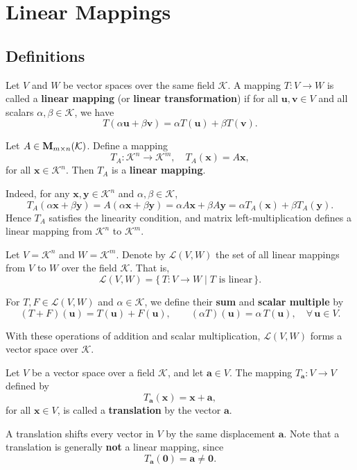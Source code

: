 \chapter{Linear Mappings}

\section{Definitions}
\begin{definitionenv}
	Let $V$ and $W$ be vector spaces over the same field $\mathcal{K}$.
	A mapping $T : V \to W$ is called a \textbf{linear mapping} (or \textbf{linear transformation}) if for all
	$\bm{u}, \bm{v} \in V$ and all scalars $\alpha, \beta \in \mathcal{K}$, we have
	\[
	T(\alpha \bm{u} + \beta \bm{v})
	= \alpha T(\bm{u}) + \beta T(\bm{v}).
	\]
\end{definitionenv}

\begin{exampleenv}
	Let $A \in \mathbf{M}_{m \times n}(\mathcal{K})$.
	Define a mapping
	\[
	T_A : \mathcal{K}^n \to \mathcal{K}^m, \quad
	T_A(\bm{x}) = A\bm{x},
	\]
	for all $\bm{x} \in \mathcal{K}^n$.
	Then $T_A$ is a \textbf{linear mapping}.

	Indeed, for any $\bm{x}, \bm{y} \in \mathcal{K}^n$ and $\alpha, \beta \in \mathcal{K}$,
	\[
	T_A(\alpha \bm{x} + \beta \bm{y})
	= A(\alpha \bm{x} + \beta \bm{y})
	= \alpha A\bm{x} + \beta A\bm{y}
	= \alpha T_A(\bm{x}) + \beta T_A(\bm{y}).
	\]
	Hence $T_A$ satisfies the linearity condition,
	and matrix left-multiplication defines a linear mapping from $\mathcal{K}^n$ to $\mathcal{K}^m$.
\end{exampleenv}

\begin{exampleenv}
	Let $V = \mathcal{K}^n$ and $W = \mathcal{K}^m$.
	Denote by $\mathcal{L}(V, W)$ the set of all linear mappings from $V$ to $W$ over the field $\mathcal{K}$.
	That is,
	\[
	\mathcal{L}(V, W)
	= \{\, T : V \to W \mid T \text{ is linear} \,\}.
	\]

	For $T, F \in \mathcal{L}(V, W)$ and $\alpha \in \mathcal{K}$,
	we define their \textbf{sum} and \textbf{scalar multiple} by
	\[
	(T + F)(\bm{u}) = T(\bm{u}) + F(\bm{u}),
	\qquad
	(\alpha T)(\bm{u}) = \alpha\, T(\bm{u}),
	\quad \forall\, \bm{u} \in V.
	\]

	With these operations of addition and scalar multiplication,
	$\mathcal{L}(V, W)$ forms a vector space over $\mathcal{K}$.
\end{exampleenv}


\begin{definitionenv}
	Let $V$ be a vector space over a field $\mathcal{K}$, and let $\bm{a} \in V$.
	The mapping $T_{\bm{a}} : V \to V$ defined by
	\[
	T_{\bm{a}}(\bm{x}) = \bm{x} + \bm{a},
	\]
	for all $\bm{x} \in V$, is called a \textbf{translation} by the vector $\bm{a}$.

	A translation shifts every vector in $V$ by the same displacement $\bm{a}$.
	Note that a translation is generally \textbf{not} a linear mapping, since
	\[
	T_{\bm{a}}(\bm{0}) = \bm{a} \neq \bm{0}.
	\]
\end{definitionenv}

